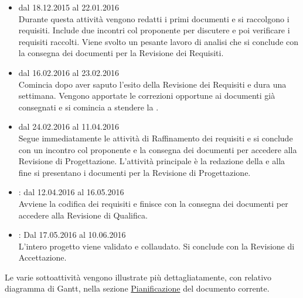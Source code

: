\documentclass[a4paper, titlepage]{article}
\begin{document}
\begin{itemize}
\item {} dal 18.12.2015 al 22.01.2016\\
Durante questa attività vengono redatti i primi documenti e  si raccolgono i requisiti. Include due incontri col proponente per discutere e poi verificare i requisiti raccolti. Viene svolto un pesante lavoro di analisi che si conclude con la consegna dei documenti per la Revisione dei Requisiti.

\item {} dal 16.02.2016 al 23.02.2016\\
Comincia dopo aver saputo l'esito della Revisione dei Requisiti e dura  una settimana. Vengono apportate le correzioni opportune ai documenti già consegnati e si comincia a stendere la .

\item {} dal 24.02.2016 al 11.04.2016\\
Segue immediatamente le attività di Raffinamento dei requisiti e si conclude con un incontro col proponente e la consegna dei documenti per accedere alla Revisione di Progettazione. L'attività principale è la redazione della  e alla fine si presentano i documenti per la Revisione di Progettazione.

\item {}: dal 12.04.2016 al 16.05.2016\\
Avviene la codifica dei requisiti e finisce con la consegna dei documenti per accedere alla Revisione di Qualifica.

\item {}: Dal 17.05.2016 al 10.06.2016\\
L'intero progetto viene validato e collaudato. Si conclude con la Revisione di Accettazione.
\end{itemize}

Le varie sottoattività vengono illustrate più dettagliatamente, con relativo diagramma di Gantt, nella sezione \hyperref[Pianificazione]{Pianificazione} del documento corrente.

\newpage
\end{document}
